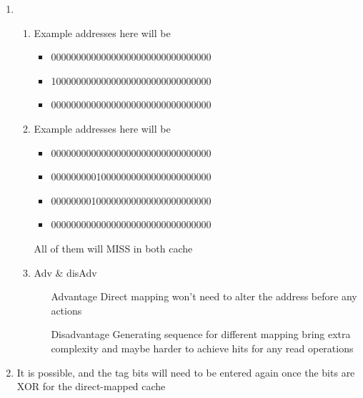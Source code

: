 \documentclass{article}
\begin{document}
\begin{enumerate}[1)]
\begin{enumerate}[1)]
        \end{enumerate}
    \item 
        \begin{enumerate}
            \item Example addresses here will be
                \begin{itemize}
                    \item 00000000000000000000000000000000
                    \item 10000000000000000000000000000000
                    \item 00000000000000000000000000000000
                \end{itemize}
            \item Example addresses here will be
                \begin{itemize}
                    \item 00000000000000000000000000000000
                    \item 00000000010000000000000000000000
                    \item 00000000100000000000000000000000
                    \item 00000000000000000000000000000000
                \end{itemize}
                All of them will MISS in both cache
            \item Adv \& disAdv
                \begin{itemize}
                    \item [Advantage] Direct mapping won't need to alter the address before any actions 
                    \item [Disadvantage] Generating sequence for different mapping bring extra complexity and maybe harder to achieve hits for any read operations
                \end{itemize}
        \end{enumerate}
    \item It is possible, and the tag bits will need to be entered again once the bits are XOR for the direct-mapped cache
\end{enumerate}
\end{document}
